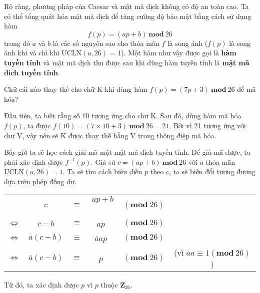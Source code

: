 Rõ ràng, phương pháp của Caesar và mật mã dịch không có độ an toàn cao. Ta có thể tổng quát hóa mật mã dịch để tăng cường độ bảo mật bằng cách sử dụng hàm
$$f(p) = (ap+b)\ \mathbf{mod}\ 26$$
trong đó $a$ và $b$ là các số nguyên sao cho thỏa mãn $f$ là song ánh ($f(p)$ là song ánh khi và chỉ khi UCLN$(a,26)$ = 1). Một hàm như vậy được gọi là \textbf{hàm tuyến tính} và mật mã dịch thu được sau khi dùng hàm tuyến tính là \textbf{mật mã dich tuyến tính}.
\begin{example}
    Chữ cái nào thay thế cho chữ K khi dùng hàm $f(p) = (7p + 3)\ \mathbf{mod}\ 26$ để mã hóa?
\end{example}
\begin{solution}
    Đầu tiên, ta biết rằng số 10 tương ứng cho chữ K. Sau đó, dùng hàm mã hóa $f(p)$, ta được $f (10) = (7 \times 10 + 3)\ \mathbf{mod}\ 26 = 21$. Bởi vì 21 tương ứng với chữ V, vậy nên sẽ K được thay thế bằng V trong thông điệp mã hóa.
\end{solution}

Bây giờ ta sẽ học cách giải mã một mật mã dịch tuyến tính. Để giả mã được, ta phải xác định được $f^{-1}(p)$. Giả sử $c= (ap+b)\ \mathbf{mod}\ 26$ với $a$ thỏa mãn UCLN$(a,26)=1$. Ta sẽ tìm cách biêu diễn $p$ theo $c$, ta sẽ biến đổi tương đương dựa trên phép đồng dư.

\begin{center}
    \begin{tabular}{ c c c c c c }
                           & $c$                    & $\equiv$ & $ap+b$\            & $(\mathbf{mod}\ 26)$               &                                                  \\
        $\Leftrightarrow $ & $c - b$                & $\equiv$ & $ap$\              & $(\mathbf{mod}\ 26)$               &                                                  \\
        $\Leftrightarrow $ & $\overline{a} (c - b)$ & $\equiv$ & $\overline{a}ap$\  & $(\mathbf{mod}\ 26)$ \footnotemark &                                                  \\
        $\Leftrightarrow $ & $\overline{a} (c - b)$ & $\equiv$ & $p$\               & $(\mathbf{mod}\ 26)$               & (vì $\overline{a}a \equiv 1 (\mathbf{mod}\ 26)$) \\
    \end{tabular}
\end{center}
Từ đó, ta xác định được $p$ vì $p$ thuộc $\mathbf{Z}_{26}$. \\

